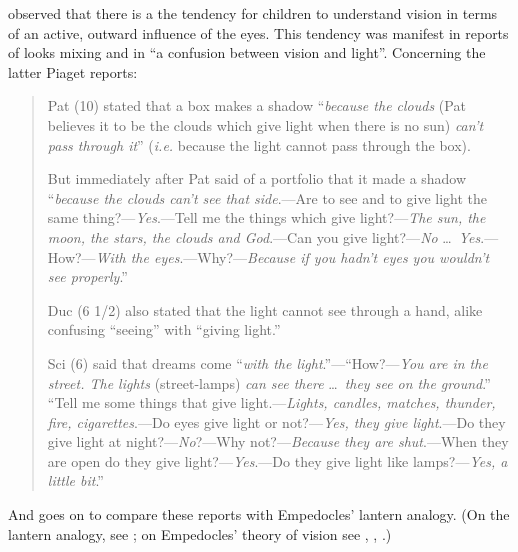 \citet[48]{Piaget:1929dp} observed that there is a the tendency for children to understand vision in terms of an active, outward influence of the eyes. This tendency was manifest in reports of looks mixing and in ``a confusion between vision and light''. Concerning the latter Piaget reports:
\begin{quotation}

	Pat (10) stated that a box makes a shadow ``\emph{because the clouds} (Pat believes it to be the clouds which give light when there is no sun) \emph{can't pass through it}'' (\emph{i.e.} because the light cannot pass through the box).
	
	But immediately after Pat said of a portfolio that it made a shadow ``\emph{because the clouds can't see that side}.---Are to see and to give light the same thing?---\emph{Yes}.---Tell me the things which give light?---\emph{The sun, the moon, the stars, the clouds and God}.---Can you give light?---\emph{No} \ldots\ \emph{Yes}.---How?---\emph{With the eyes}.---Why?---\emph{Because if you hadn't eyes you wouldn't see properly}.''
	
	Duc (6 1/2) also stated that the light cannot see through a hand, alike confusing ``seeing'' with ``giving light.''
	
	Sci (6) said that dreams come ``\emph{with the light}.''---``How?---\emph{You are in the street. The lights} (street-lamps) \emph{can see there} \ldots\ \emph{they see on the ground}.'' ``Tell me some things that give light.---\emph{Lights, candles, matches, thunder, fire, cigarettes}.---Do eyes give light or not?---\emph{Yes, they give light}.---Do they give light at night?---\emph{No}?---Why not?---\emph{Because they are shut}.---When they are open do they give light?---\emph{Yes}.---Do they give light like lamps?---\emph{Yes, a little bit}.'' \citep[48]{Piaget:1929dp}
\end{quotation}
And \citet[48--49]{Piaget:1929dp} goes on to compare these reports with Empedocles' lantern analogy. (On the lantern analogy, see \citealt[240--243]{Wright:1981zr}; on Empedocles' theory of vision see \citealt{Sedley:1992uq}, \citealt{Ierodiakonou:2005fk}, \citealt[chapter 1]{Kalderon:2015fr}.)
